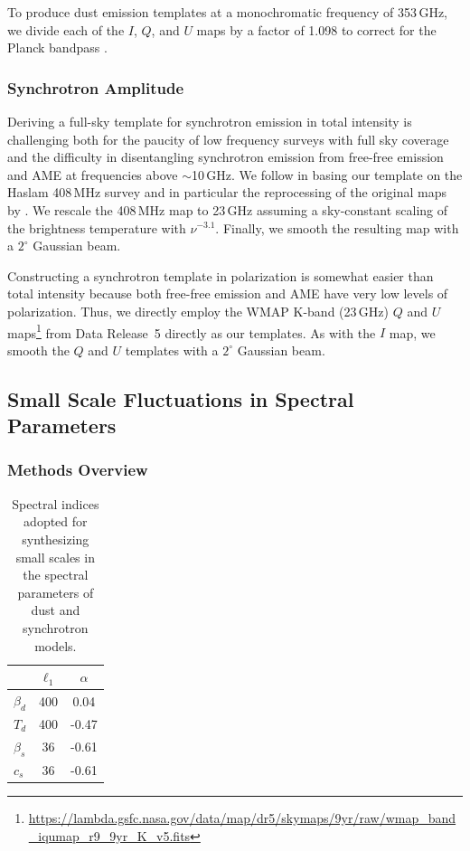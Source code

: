 \documentclass[twocolumn]{aastex631}
\begin{document}
To produce dust emission templates at a monochromatic frequency of 353\,GHz, we divide each of the $I$, $Q$, and $U$ maps by a factor of 1.098 to correct for the Planck bandpass \citep[][Table~2]{planck2016-l11A}.

\subsubsection{Synchrotron Amplitude}
Deriving a full-sky template for synchrotron emission in total intensity is challenging both for the paucity of low frequency surveys with full sky coverage and the difficulty in disentangling synchrotron emission from free-free emission and AME at frequencies above $\sim$10\,GHz. We follow \citet{Thorne:2017} in basing our template on the Haslam 408\,MHz survey \citep{Haslam:1982} and in particular the reprocessing of the original maps by \citet{Remazeilles:2015}. We rescale the 408\,MHz map to 23\,GHz assuming a sky-constant scaling of the brightness temperature with $\nu^{-3.1}$. Finally, we smooth the resulting map with a $2^\circ$ Gaussian beam.

Constructing a synchrotron template in polarization is somewhat easier than total intensity because both free-free emission and AME have very low levels of polarization. Thus, we directly employ the WMAP K-band (23\,GHz) $Q$ and $U$ maps\footnote{\url{https://lambda.gsfc.nasa.gov/data/map/dr5/skymaps/9yr/raw/wmap_band_iqumap_r9_9yr_K_v5.fits}} from Data Release~5 directly as our templates. As with the $I$ map, we smooth the $Q$ and $U$ templates with a $2^\circ$ Gaussian beam.

\subsection{Small Scale Fluctuations in Spectral Parameters} \label{sec:spec_params}

\subsubsection{Methods Overview}
\begin{table}
    \centering
    \begin{tabular}{lcc}
    \toprule 
   &   $ \ell_1   $    &$\alpha$  \\
   \midrule  
   $\beta_d$ & 400 & 0.04 \\ 
   $T_d$  &  400  & -0.47\\
    \midrule 
    $\beta_s$ & 36 & -0.61\\
    $c_s$ & 36 &  -0.61  \\ 
   \bottomrule
    \end{tabular}
    \caption{Spectral indices adopted for synthesizing small scales in the spectral parameters of dust and synchrotron models. }
    \label{tab:smallscale_specpar}
\end{table}
\end{document}
